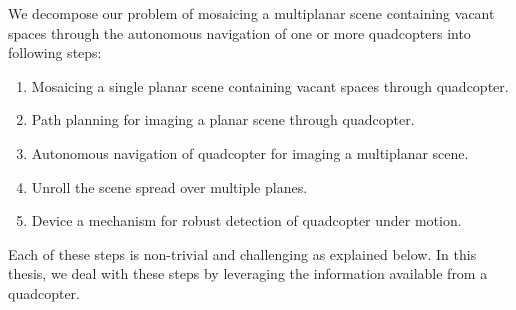 We decompose our problem of mosaicing a multiplanar scene containing
vacant spaces through the autonomous navigation of one or more quadcopters
into following steps:
\begin{enumerate}
  \item Mosaicing a single planar scene containing vacant spaces through
  quadcopter.
  \item Path planning for imaging a planar scene through quadcopter.
  \item Autonomous navigation of quadcopter for imaging a multiplanar scene.
  \item Unroll the scene spread over multiple planes.
  \item Device a mechanism for robust detection of quadcopter under motion. 
\end{enumerate}
Each of these steps is non-trivial and challenging as explained below. In this
thesis, we deal with these steps by leveraging the information available from a quadcopter.  

